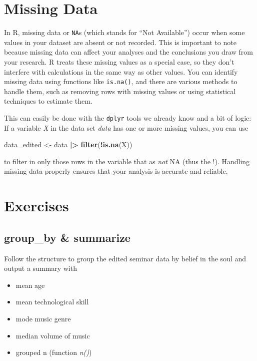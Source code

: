 \documentclass[
]{book}
\newenvironment{Shaded}{\begin{snugshade}}{\end{snugshade}}
\newcommand{\FunctionTok}[1]{\textcolor[rgb]{0.13,0.29,0.53}{\textbf{#1}}}
\newcommand{\NormalTok}[1]{#1}
\newcommand{\OtherTok}[1]{\textcolor[rgb]{0.56,0.35,0.01}{#1}}
\newcommand{\SpecialCharTok}[1]{\textcolor[rgb]{0.81,0.36,0.00}{\textbf{#1}}}
\providecommand{\tightlist}{%
  \setlength{\itemsep}{0pt}\setlength{\parskip}{0pt}}
\begin{document}
\section{Missing Data}\label{missing-data}

In R, missing data or \texttt{NA}s (which stands for ``Not Available'') occur when some values in your dataset are absent or not recorded.
This is important to note because missing data can affect your analyses and the conclusions you draw from your research.
R treats these missing values as a special case, so they don't interfere with calculations in the same way as other values.
You can identify missing data using functions like \texttt{is.na()}, and there are various methods to handle them, such as removing rows with missing values or using statistical techniques to estimate them.

This can easily be done with the \texttt{dplyr} tools we already know and a bit of logic:
If a variable \emph{X} in the data set \emph{data} has one or more missing values, you can use

\begin{Shaded}
\begin{Highlighting}[]
\NormalTok{data\_edited }\OtherTok{\textless{}{-}}\NormalTok{ data }\SpecialCharTok{|\textgreater{}} 
  \FunctionTok{filter}\NormalTok{(}\SpecialCharTok{!}\FunctionTok{is.na}\NormalTok{(X))}
\end{Highlighting}
\end{Shaded}

to filter in only those rows in the variable that as \emph{not} NA (thus the !).
Handling missing data properly ensures that your analysis is accurate and reliable.

\section*{Exercises}\label{exercises-2}

\subsection*{group\_by \& summarize}\label{group_by-summarize-2}

Follow the structure to group the edited seminar data by belief in the soul and output a summary with

\begin{itemize}
\tightlist
\item
  mean age
\item
  mean technological skill
\item
  mode music genre
\item
  median volume of music
\item
  grouped n (function \emph{n()})
\end{itemize}
\end{document}
